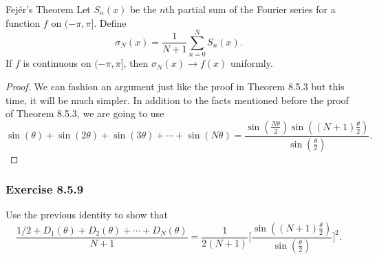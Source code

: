 \begin{theorem}{Fej\'{e}r's Theorem }{}
   Let \( S_{n}(x)  \) be the \( n \)th partial sum of the Fourier series for a function \( f  \) on \( (- \pi ,\pi ] \). Define 
   \[  \sigma_{N}(x) = \frac{ 1 }{ N+1 } \sum_{ n=0 }^{ N } S_{n}(x). \]
   If \( f  \) is continuous on \( (- \pi ,\pi] \), then \( \sigma_{N}(x) \to f(x)  \) uniformly.
\end{theorem}

\begin{proof}
We can fashion an argument just like the proof in Theorem 8.5.3 but this time, it will be much simpler. In addition to the facts mentioned before the proof of Theorem 8.5.3, we are going to use 
\[  \sin(\theta) + \sin(2 \theta) + \sin(3 \theta) + \dotsb + \sin(N \theta) = \frac{ \sin(\frac{ N \theta }{ 2  } ) \sin((N+1) \frac{ \theta }{ 2  } ) }{  \sin(\frac{ \theta }{ 2 } ) }.  \]
\end{proof}



\subsubsection{Exercise 8.5.9} Use the previous identity to show that
\[  \frac{ 1 /2 + D_{1}(\theta) + D_{2}(\theta) + \dotsb  + D_{N}(\theta) }{ N+1  } = \frac{ 1 }{ 2 (N+1)  } \Bigg[\frac{ \sin((N+1) \frac{ \theta }{ 2 } ) }{ \sin( \frac{ \theta  }{ 2 } ) } \Bigg]^{2}.  \]

